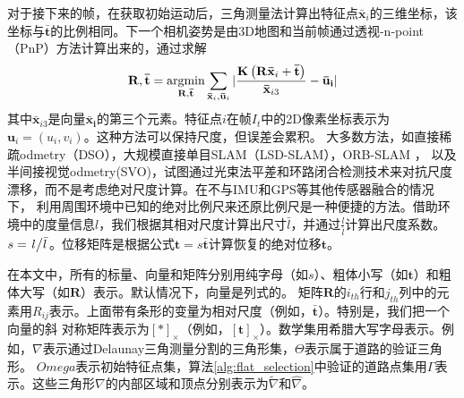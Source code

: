 对于接下来的帧，在获取初始运动后，三角测量法计算出特征点$\mathbf{\bar{x}}_i$的三维坐标，该坐标与$\bar{\mathbf{t}}$的比例相同。下一个相机姿势是由3D地图和当前帧通过透视-n-point（PnP）方法计算出来的\cite{lepetit2009epnp}，通过求解 
\begin{equation}
    \mathbf{R,\bar{t}}=\mathop{\operatorname*{argmin}}_{\mathbf{R,\bar{t}}}\sum_{\mathbf{\bar{x}}_i, \mathbf{\bar{u}}_i}|\frac{\mathbf{K}\left(\mathbf{R}\mathbf{\bar{x}}_i+\mathbf{\bar{t}}\right)}{\mathbf{\bar{x}}_{i3}}-\mathbf{\bar{u}_i}|
\end{equation}
其中$\mathbf{\bar{x}}_{i3}$是向量$\mathbf{\bar{x}_i}$的第三个元素。特征点$i$在帧$I_t$中的2D像素坐标表示为$\mathbf{u}_i=(u_i,v_i)$。这种方法可以保持尺度，但误差会累积。
大多数方法，如直接稀疏odmetry（DSO）\cite{engel2017direct}，大规模直接单目SLAM（LSD-SLAM）\cite{engel2014lsd}，ORB-SLAM \cite{raul2015orb}，
以及半间接视觉odmetry(SVO)\cite{forster2014svo}，试图通过光束法平差和环路闭合检测技术来对抗尺度漂移，而不是考虑绝对尺度计算。在不与IMU和GPS等其他传感器融合的情况下，
利用周围环境中已知的绝对比例尺来还原比例尺是一种便捷的方法。借助环境中的度量信息$l$，我们根据其相对尺度计算出尺寸$\bar{l}$，并通过$\frac{l}{\bar{l}}$计算出尺度系数。
$s=\left.{l}\middle/ \bar{l} \right.$。位移矩阵是根据公式$\mathbf{t}=s\mathbf{\bar{t}}$计算恢复的绝对位移$\mathbf{t}$。

在本文中，所有的标量、向量和矩阵分别用纯字母（如$s$）、粗体小写（如$\mathbf{t}$）和粗体大写（如$\mathbf{R}$）表示。默认情况下，向量是列式的。
矩阵$\mathbf{R}$的$i_{th}$行和$j_{th}$列中的元素用$R_{ij}$表示。上面带有条形的变量为相对尺度（例如，$\mathbf{\bar{t}}$）。特别是，我们把一个向量的斜
对称矩阵表示为$[*]_\times$（例如，$[\mathbf{t}]_\times$）。数学集用希腊大写字母表示。例如，$\nabla$表示通过Delaunay三角测量分割的三角形集，$\Theta$表示属于道路的验证三角形。
$Omega$表示初始特征点集，算法\ref{alg:flat_selection}中验证的道路点集用$\Gamma$表示。这些三角形$\nabla$的内部区域和顶点分别表示为$\widetilde{\nabla}$和$\widehat{\nabla}$。